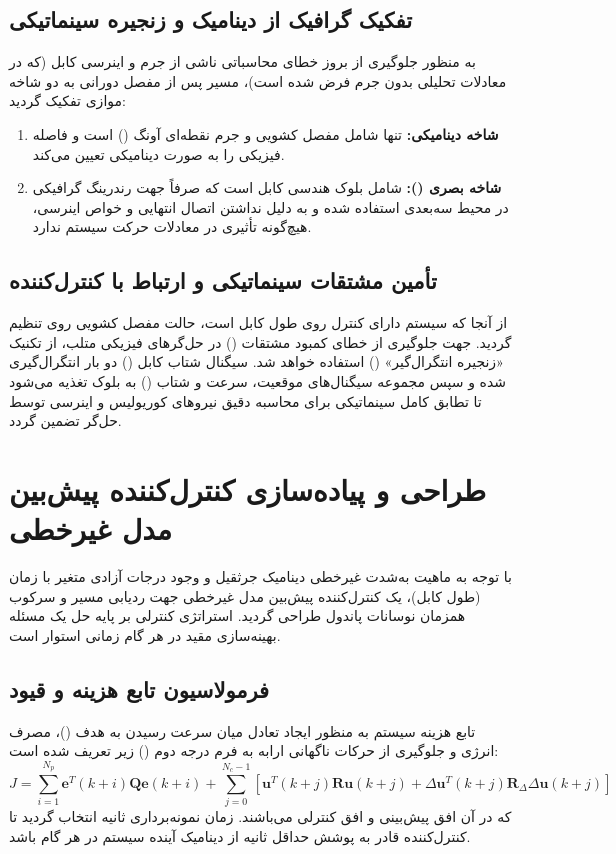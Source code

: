 \subsection{تفکیک گرافیک از دینامیک و زنجیره سینماتیکی}
به منظور جلوگیری از بروز خطای محاسباتی ناشی از جرم و اینرسی کابل (که در معادلات تحلیلی بدون جرم فرض شده است)، مسیر پس از مفصل دورانی به دو شاخه موازی تفکیک گردید:
\begin{enumerate}
    \item \textbf{شاخه دینامیکی:} تنها شامل مفصل کشویی و جرم نقطه‌ای آونگ () است و فاصله فیزیکی را به صورت دینامیکی تعیین می‌کند.
    \item \textbf{شاخه بصری ():} شامل بلوک هندسی کابل است که صرفاً جهت رندرینگ گرافیکی در محیط سه‌بعدی استفاده شده و به دلیل نداشتن اتصال انتهایی و خواص اینرسی، هیچ‌گونه تأثیری در معادلات حرکت سیستم ندارد.
\end{enumerate}

\subsection{تأمین مشتقات سینماتیکی و ارتباط با کنترل‌کننده}
از آنجا که سیستم دارای کنترل روی طول کابل است، حالت مفصل کشویی روی  تنظیم گردید. جهت جلوگیری از خطای کمبود مشتقات () در حل‌گرهای فیزیکی متلب، از تکنیک «زنجیره انتگرال‌گیر» () استفاده خواهد شد. سیگنال شتاب کابل () دو بار انتگرال‌گیری شده و سپس مجموعه سیگنال‌های موقعیت، سرعت و شتاب () به بلوک  تغذیه می‌شود تا تطابق کامل سینماتیکی برای محاسبه دقیق نیروهای کوریولیس و اینرسی توسط حل‌گر  تضمین گردد.

\section{طراحی و پیاده‌سازی کنترل‌کننده پیش‌بین مدل غیرخطی }

با توجه به ماهیت به‌شدت غیرخطی دینامیک جرثقیل و وجود درجات آزادی متغیر با زمان (طول کابل)، یک کنترل‌کننده پیش‌بین مدل غیرخطی جهت ردیابی مسیر و سرکوب همزمان نوسانات پاندول طراحی گردید. استراتژی کنترلی بر پایه حل یک مسئله بهینه‌سازی مقید در هر گام زمانی استوار است.

\subsection{فرمولاسیون تابع هزینه و قیود}
تابع هزینه سیستم به منظور ایجاد تعادل میان سرعت رسیدن به هدف ()، مصرف انرژی و جلوگیری از حرکات ناگهانی ارابه به فرم درجه دوم () زیر تعریف شده است:
\begin{equation}
    J = \sum_{i=1}^{N_p} \mathbf{e}^T(k+i) \mathbf{Q} \mathbf{e}(k+i) + \sum_{j=0}^{N_c-1} \left[ \mathbf{u}^T(k+j) \mathbf{R} \mathbf{u}(k+j) + \Delta\mathbf{u}^T(k+j) \mathbf{R}_{\Delta} \Delta\mathbf{u}(k+j) \right]
\end{equation}
که در آن  افق پیش‌بینی و  افق کنترلی می‌باشند. زمان نمونه‌برداری  ثانیه انتخاب گردید تا کنترل‌کننده قادر به پوشش حداقل  ثانیه از دینامیک آینده سیستم در هر گام باشد.


